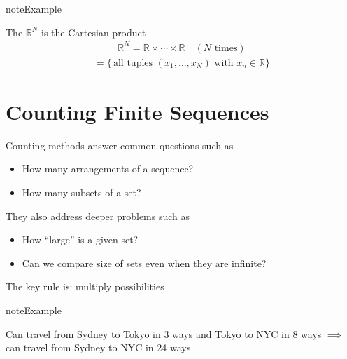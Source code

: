 \documentclass[letterpaper,10pt,english]{jupyterBook}
\begin{document}
\begin{sphinxadmonition}{note}{Example}

\sphinxAtStartPar
The  \(\mathbb{R}^N\) is the Cartesian product
\begin{equation*}
\begin{split}
\mathbb{R}^N = \mathbb{R} \times \cdots \times \mathbb{R} \quad (N \text{ times})
\end{split}
\end{equation*}\begin{equation*}
\begin{split}
= \{ 
\, \text{all tuples } (x_1, \ldots, x_N) \text{ with } x_n \in \mathbb{R}
\}
\end{split}
\end{equation*}\end{sphinxadmonition}


\section{Counting Finite Sequences}
\label{\detokenize{03.set_theory:counting-finite-sequences}}
\sphinxAtStartPar
Counting methods answer common questions such as
\begin{itemize}
\item {} 
\sphinxAtStartPar
How many arrangements of a sequence?

\item {} 
\sphinxAtStartPar
How many subsets of a set?

\end{itemize}

\sphinxAtStartPar
They also address deeper problems such as
\begin{itemize}
\item {} 
\sphinxAtStartPar
How “large” is a given set?

\item {} 
\sphinxAtStartPar
Can we compare size of sets even when they are infinite?

\end{itemize}

\sphinxAtStartPar
The key rule is: multiply possibilities

\begin{sphinxadmonition}{note}{Example}

\sphinxAtStartPar
Can travel from Sydney to Tokyo in 3 ways and Tokyo to NYC in 8 ways
\(\implies\) can travel from Sydney to NYC in 24 ways
\end{sphinxadmonition}
\end{document}
